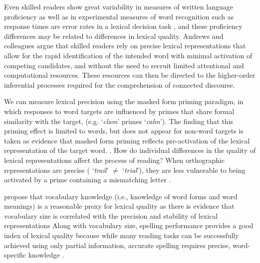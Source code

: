\documentclass[review]{elsarticle}
\begin{document}
Even skilled readers show great variability in measures of written language proficiency as well as in experimental measures of word recognition such as response times are error rates in a lexical decision task \citep{andrewsIndividualDifferencesSkilled2012}, and these proficiency differences  may be related to differences in lexical quality.  Andrews and colleagues \citep{andrewsLexicalExpertiseReading2009, andrewsLexicalPrecisionSkilled2010, andrewsIndividualDifferencesSkilled2012, andrewsMorphologicalPrimingStronger2013}  argue that skilled readers rely on precise lexical representations that allow for the rapid identification of the intended word with minimal activation of competing candidates, and without the need to recruit limited attentional and computational resources.  These resources can then be directed to the higher-order inferential processes required for the comprehension of connected discourse.

We can measure lexical precision using the masked form priming paradigm, in which  responses to word targets are influenced by primes that share formal similarity with the target, (e.g. `\textit{clam}' primes `\textit{calm}').  The finding that this priming effect is limited to words, but does not appear for non-word targets is taken as evidence that masked form priming reflects pre-activation of the lexical representation of the target word. \citep{andrewsLexicalPrecisionSkilled2010,forsterRepetitionPrimingFrequency1984}.   How do individual differences in the quality of lexical representations affect the process of reading?  When orthographic representations are precise ( `\textit{trail}' $\neq$ `\textit{trial}'), they are less vulnerable to being activated by a prime containing a mismatching letter \citep{forsterBodiesAntibodiesNeighborhooddensity1994}.  

\citet{yapIndividualDifferencesJoint2009} propose that vocabulary knowledge (i.e., knowledge of word forms and word meanings) is a reasonable proxy for lexical quality as there is evidence that vocabulary size is correlated with the precision and stability of lexical representations \citep{perfettiReadingAbilityLexical2007, perfettiLexicalQualityHypothesis2002, kiddIndividualDifferencesStatistical2016,kinoshitaAdditiveInteractiveEffects2006, kinoshitaHowLexicalDecision2006}  Along with vocabulary size, spelling performance provides a good index of lexical quality because while many reading tasks can be successfully achieved using only partial information, accurate spelling requires precise, word-specific knowledge \citep{perfettiRepresentationProblemReading1992}.
\end{document}
